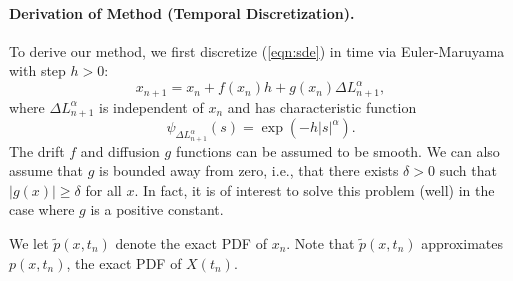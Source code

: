 \documentclass[12pt]{l4dc2021}
\begin{document}
\paragraph{Derivation of Method (Temporal Discretization).} To derive our method, we first discretize (\ref{eqn:sde}) in time via Euler-Maruyama with step $h > 0$:
\begin{equation}
\label{eqn:em}
x_{n+1} = x_n + f(x_{n}) h + g(x_{n}) \Delta L_{n+1}^{\alpha},
\end{equation}
where $\Delta L_{n+1}^{\alpha}$ is independent of $x_n$ and has characteristic function
\begin{equation}
\label{eqn:emchar}
\psi_{\Delta L^{\alpha}_{n+1}}(s) = \exp(- h |s|^\alpha).
\end{equation}
The drift $f$ and diffusion $g$ functions can be assumed to be smooth.  We can also assume that $g$ is bounded away from zero, i.e., that there exists $\delta > 0$ such that $|g(x)| \geq \delta$ for all $x$.  In fact, it is of interest to solve this problem (well) in the case where $g$ is a positive constant.

We let $\widetilde{p}(x,t_n)$ denote the exact PDF of $x_n$.  Note that $\widetilde{p}(x, t_n)$ approximates $p(x, t_n)$, the exact PDF of $X(t_n)$.
\end{document}
